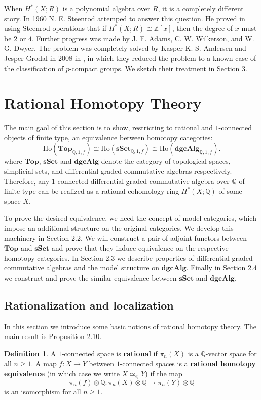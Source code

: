 \documentclass[psamsfonts]{amsart}
\theoremstyle{definition}
\newtheorem{defn}{Definition}[section]
\newcommand{\Q}{\mathbb{Q}}
\newcommand{\Z}{\mathbb{Z}}
\newcommand{\Top}{\mathbf{Top}}
\newcommand{\sSet}{\mathbf{sSet}}
\newcommand{\dgcAlg}{\mathbf{dgcAlg}}
\newcommand{\Ho}{\mathrm{Ho}}
\numberwithin{equation}{section}
\begin{document}
When $H^\ast(X;R)$ is a polynomial algebra over $R$, it is a completely different story. In 1960 N. E. Steenrod attemped to answer this question. He proved in \cite{Steenrod} using Steenrod operations that if $H^\ast(X;R)\cong\Z[x]$, then the degree of $x$ must be $2$ or $4$. Further progress was made by J. F. Adams, C. W. Wilkerson, and W. G. Dwyer. The problem was completely solved by Kasper K. S. Andersen and Jesper Grodal in 2008 in \cite{Andersen-Grodal}, in which they reduced the problem to a known case of the classification of $p$-compact groups. We sketch their treatment in Section 3.

\section{Rational Homotopy Theory}

The main gaol of this section is to show, restricting to rational and $1$-connected objects of finite type, an equivalence between homotopy categories:
\[\Ho(\Top_{\Q,1,f})\cong\Ho(\sSet_{\Q,1,f})\cong\Ho(\dgcAlg_{\Q,1,f}).\]
where $\Top$, $\sSet$ and $\dgcAlg$ denote the category of topological spaces, simplicial sets, and differential graded-commutative algebras respectively.
Therefore, any $1$-connected differential graded-commutative algebra over $\Q$ of finite type can be realized as a rational cohomology ring $H^\ast(X;\Q)$ of some space $X$.

To prove the desired equivalence, we need the concept of model categories, which impose an additional structure on the original categories. We develop this machinery in Section 2.2. We will construct a pair of adjoint functors between $\Top$ and $\sSet$ and prove that they induce equivalence on the respective homotopy categories. In Section 2.3 we describe properties of differential graded-commutative algebras and the model structure on $\dgcAlg$. Finally in Section 2.4 we construct and prove the similar equivalence between $\sSet$ and $\dgcAlg$.

\subsection{Rationalization and localization}

In this section we introduce some basic notions of rational homotopy theory. The main result is Proposition 2.10.

\begin{defn}
A $1$-connected space is \textbf{rational} if $\pi_n(X)$ is a $\Q$-vector space for all $n\geq1$. A map $f:X\to Y$ between $1$-connected spaces is a \textbf{rational homotopy equivalence} (in which case we write $X\simeq_\Q Y$) if the map
\[\pi_n(f)\otimes\Q:\pi_n(X)\otimes\Q\to\pi_n(Y)\otimes\Q\]
is an isomorphism for all $n\geq1$.
\end{defn}
\end{document}
